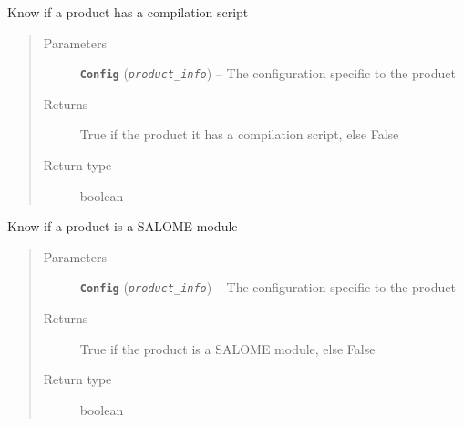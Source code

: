 \documentclass[a4paper,10pt,english]{sphinxmanual}
\begin{document}
\begin{fulllineitems}
\label{commands/apidoc/src:src.product.product_has_script}
Know if a product has a compilation script
\begin{quote}\begin{description}
\item[{Parameters}] \leavevmode
\textbf{\texttt{Config}} (\emph{\texttt{product\_info}}) -- The configuration specific to 
the product

\item[{Returns}] \leavevmode
True if the product it has a compilation script, else False

\item[{Return type}] \leavevmode
boolean

\end{description}\end{quote}

\end{fulllineitems}


\begin{fulllineitems}
\label{commands/apidoc/src:src.product.product_is_SALOME}
Know if a product is a SALOME module
\begin{quote}\begin{description}
\item[{Parameters}] \leavevmode
\textbf{\texttt{Config}} (\emph{\texttt{product\_info}}) -- The configuration specific to 
the product

\item[{Returns}] \leavevmode
True if the product is a SALOME module, else False

\item[{Return type}] \leavevmode
boolean

\end{description}\end{quote}

\end{fulllineitems}

\end{document}

